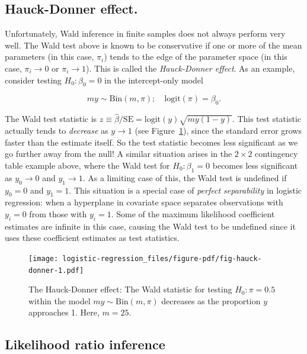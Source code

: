 \documentclass[
  11pt,
  letterpaper,
  oneside]{book}
\theoremstyle{plain}
\theoremstyle{plain}
\theoremstyle{definition}
\theoremstyle{plain}
\theoremstyle{definition}
\theoremstyle{remark}
\begin{document}
\hypertarget{sec-hauck-donner-effect}{%
\subsection{Hauck-Donner effect.}\label{sec-hauck-donner-effect}}

Unfortunately, Wald inference in finite samples does not always perform
very well. The Wald test above is known to be conservative if one or
more of the mean parameters (in this case, \(\pi_i\)) tends to the edge
of the parameter space (in this case, \(\pi_i \rightarrow 0\) or
\(\pi_i \rightarrow 1\)). This is called the \emph{Hauck-Donner effect}.
As an example, consider testing \(H_0: \beta_0 = 0\) in the
intercept-only model

\[
my \sim \text{Bin}(m, \pi); \quad \text{logit}(\pi) = \beta_0.
\]

The Wald test statistic is
\(z \equiv \widehat \beta/\text{SE} = \text{logit}(y)\sqrt{my(1-y)}\).
This test statistic actually tends to \emph{decrease} as
\(y \rightarrow 1\) (see Figure~\ref{fig-hauck-donner}), since the
standard error grows faster than the estimate itself. So the test
statistic becomes less significant as we go further away from the null!
A similar situation arises in the \(2 \times 2\) contingency table
example above, where the Wald test for \(H_0: \beta_1 = 0\) becomes less
significant as \(y_0 \rightarrow 0\) and \(y_1 \rightarrow 1\). As a
limiting case of this, the Wald test is undefined if \(y_0 = 0\) and
\(y_1 = 1\). This situation is a special case of \emph{perfect
separability} in logistic regression: when a hyperplane in covariate
space separates observations with \(y_i = 0\) from those with
\(y_i = 1\). Some of the maximum likelihood coefficient estimates are
infinite in this case, causing the Wald test to be undefined since it
uses these coefficient estimates as test statistics.

\begin{figure}

{\centering \texttt{[image: logistic-regression\_files/figure-pdf/fig-hauck-donner-1.pdf]}

}

\caption{\label{fig-hauck-donner}The Hauck-Donner effect: The Wald
statistic for testing \(H_0: \pi = 0.5\) within the model
\(my \sim \text{Bin}(m, \pi)\) decreases as the proportion \(y\)
approaches 1. Here, \(m = 25\).}

\end{figure}

\hypertarget{sec-likelihood-ratio-inference}{%
\subsection{Likelihood ratio
inference}\label{sec-likelihood-ratio-inference}}
\end{document}
